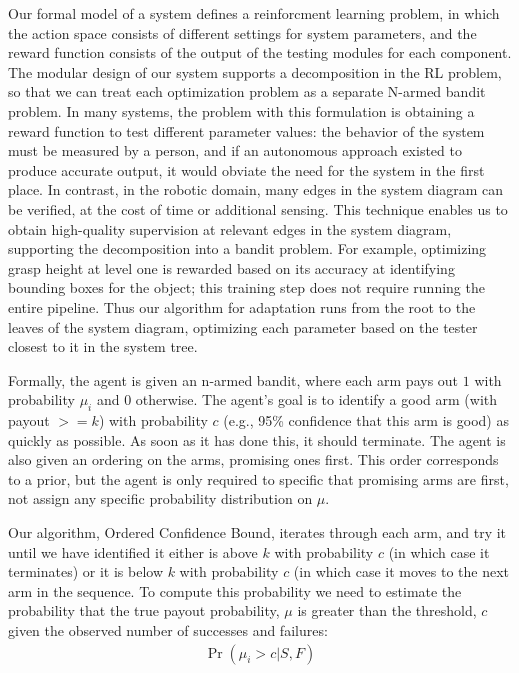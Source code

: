 \documentclass{article}
\newcommand{\algorithmCTxt}{Ordered Confidence Bound}
\begin{document}
Our formal model of a system defines a reinforcment learning problem,
in which the action space consists of different settings for system
parameters, and the reward function consists of the output of the
testing modules for each component.  The modular design of our system
supports a decomposition in the RL problem, so that we can treat each
optimization problem as a separate N-armed bandit problem.  In many
systems, the problem with this formulation is obtaining a reward
function to test different parameter values: the behavior of the
system must be measured by a person, and if an autonomous approach
existed to produce accurate output, it would obviate the need for the
system in the first place.  In contrast, in the robotic domain, many
edges in the system diagram can be verified, at the cost of time or
additional sensing.  This technique enables us to obtain high-quality
supervision at relevant edges in the system diagram, supporting the
decomposition into a bandit problem.  For example, optimizing grasp
height at level one is rewarded based on its accuracy at identifying
bounding boxes for the object; this training step does not require
running the entire pipeline.  Thus our algorithm for adaptation runs
from the root to the leaves of the system diagram, optimizing each
parameter based on the tester closest to it in the system tree.

Formally, the agent is given an n-armed bandit, where each arm pays
out $1$ with probability $\mu_i$ and $0$ otherwise.  The agent's goal
is to identify a good arm (with payout $>= k$) with probability $c$
(e.g., 95\% confidence that this arm is good) as quickly as possible.
As soon as it has done this, it should terminate.  The agent is also
given an ordering on the arms, promising ones first.  This order
corresponds to a prior, but the agent is only required to specific
that promising arms are first, not assign any specific probability
distribution on $\mu$.


Our algorithm, \algorithmCTxt, iterates through each arm, and try it
until we have identified it either is above $k$ with probability $c$
(in which case it terminates) or it is below $k$ with probability $c$
(in which case it moves to the next arm in the sequence.  To compute
this probability we need to estimate the probability that the true
payout probability, $\mu$ is greater than the threshold, $c$ given the
observed number of successes and failures:
\begin{align}
\Pr(\mu_i > c|  S, F)
\end{align}
\end{document}

